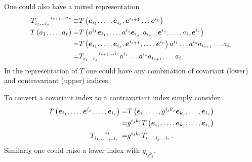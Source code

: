 One could also have a mixed representation
\begin{align}
	T\indices{_{i_{1}\dots i_{s}}^{i_{s+1}\dots i_{r}}} \equiv& \f{T}{\eb_{i_{1}},\dots,\eb_{i_{s}},\eb^{i_{s+1}}\dots\eb^{i_{r}}} \\
	\f{T}{a_{1},\dots,a_{r}} =& \f{T}{a^{i_{1}}\eb_{i_{1}},\dots,a^{i_{s}}\eb_{i_{s}},
	                            a_{i_{s+1}}\eb^{i_{s}},\dots,a_{i_{r}}\eb^{i_{r}}} \nonumber \\
	                         =& \f{T}{\eb_{i_{1}},\dots,\eb_{i_{s}},\eb^{i_{s+1}},\dots,\eb^{i_{r}}}
	                            a^{i_{1}}\dots a^{i_{s}}a_{i_{s+1}}\dots a_{i_{r}} \nonumber \\
	                         =& T\indices{_{i_{1}\dots i_{s}}^{i_{s+1}\dots i_{r}}}a^{i_{1}}\dots a^{i_{s}}a_{i_{s+1}},\dots a_{i_{r}}.
\end{align}
In the representation of $T$ one could have any combination of covariant (lower) and contravariant (upper) indices.

To convert a covariant index to a contravariant index simply consider
\begin{align}
	\f{T}{\eb_{i_{1}},\dots,\eb^{i_{j}},\dots,\eb_{i_{r}}} =& \f{T}{\eb_{i_{1}},\dots,g^{i_{j}k_{j}}\eb_{k_{j}},\dots,\eb_{i_{r}}} \nonumber \\
	                                                       =& g^{i_{j}k_{j}}\f{T}{\eb_{i_{1}},\dots,\eb_{k_{j}},\dots,\eb_{i_{r}}} \nonumber \\
	T\indices{_{i_{1}\dots}^{i_{j}}_{\dots i_{r}}} =& g^{i_{j}k_{j}}T\indices{_{i_{1}\dots i_{j}\dots i_{r}}}.
\end{align}
Similarly one could raise a lower index with $g_{i_{j}k_{j}}$.

